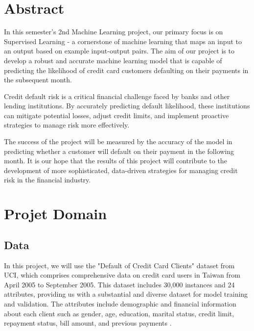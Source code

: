 \documentclass[nohyperref]{article}
\theoremstyle{plain}
\theoremstyle{definition}
\theoremstyle{remark}
\begin{document}
\section{Abstract}
In this semester's 2nd Machine Learning project, our primary focus is on Supervised Learning - a cornerstone of machine learning that maps an input to an output based on example input-output pairs. The aim of our project is to develop a robust and accurate machine learning model that is capable of predicting the likelihood of credit card customers defaulting on their payments in the subsequent month. 

Credit default risk is a critical financial challenge faced by banks and other lending institutions. By accurately predicting default likelihood, these institutions can mitigate potential losses, adjust credit limits, and implement proactive strategies to manage risk more effectively. 

The success of the project will be measured by the accuracy of the model in predicting whether a customer will default on their payment in the following month. It is our hope that the results of this project will contribute to the development of more sophisticated, data-driven strategies for managing credit risk in the financial industry. 
\section{Projet Domain}
\subsection{Data}
In this project, we will use the "Default of Credit Card Clients" dataset from UCI, which comprises comprehensive data on credit card users in Taiwan from April 2005 to September 2005. This dataset includes 30,000 instances and 24 attributes, providing us with a substantial and diverse dataset for model training and validation. The attributes include demographic and financial information about each client such as gender, age, education, marital status, credit limit, repayment status, bill amount, and previous payments \cite{Yeh_2016}.
\end{document}
